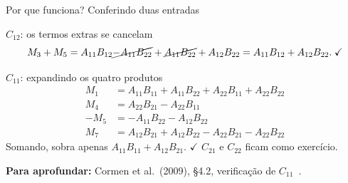 \documentclass[aspectratio=169,xcolor=table]{beamer}
\newcommand{\fonte}[1]{%
  \vfill
  {\tiny\color{gray!55!black}\textbf{Para aprofundar:} #1\par}%
}
\begin{document}
\begin{frame}{Por que funciona? Conferindo duas entradas}
  \begin{exampleblock}{$C_{12}$: os termos extras se cancelam}
    \scriptsize
    \[
      M_3 + M_5 = A_{11}B_{12} \cancel{- A_{11}B_{22}} + \cancel{A_{11}B_{22}} + A_{12}B_{22}
      = A_{11}B_{12} + A_{12}B_{22}. \;\checkmark
    \]
  \end{exampleblock}
  \begin{exampleblock}{$C_{11}$: expandindo os quatro produtos}
    \scriptsize
    \[
      \begin{aligned}
        M_1 &= A_{11}B_{11} + A_{11}B_{22} + A_{22}B_{11} + A_{22}B_{22}\\
        M_4 &= A_{22}B_{21} - A_{22}B_{11}\\
        -M_5 &= -A_{11}B_{22} - A_{12}B_{22}\\
        M_7 &= A_{12}B_{21} + A_{12}B_{22} - A_{22}B_{21} - A_{22}B_{22}
      \end{aligned}
    \]
    Somando, sobra apenas $A_{11}B_{11} + A_{12}B_{21}$. $\checkmark$
    \;$C_{21}$ e $C_{22}$ ficam como exercício.
  \end{exampleblock}
  \fonte{Cormen et al.\ (2009), \S 4.2, verificação de $C_{11}$~\cite{cormen2009introduction}.}
\end{frame}
\end{document}
